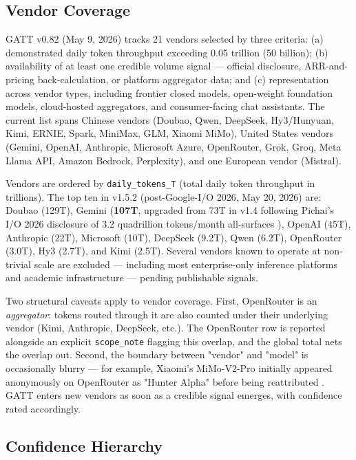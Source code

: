 \documentclass[11pt,a4paper]{article}
\begin{document}
\subsection{Vendor Coverage}

GATT v0.82 (May 9, 2026) tracks 21 vendors selected by three criteria: (a) demonstrated daily token throughput exceeding 0.05 trillion (50 billion); (b) availability of at least one credible volume signal --- official disclosure, ARR-and-pricing back-calculation, or platform aggregator data; and (c) representation across vendor types, including frontier closed models, open-weight foundation models, cloud-hosted aggregators, and consumer-facing chat assistants. The current list spans Chinese vendors (Doubao, Qwen, DeepSeek, Hy3/Hunyuan, Kimi, ERNIE, Spark, MiniMax, GLM, Xiaomi MiMo), United States vendors (Gemini, OpenAI, Anthropic, Microsoft Azure, OpenRouter, Grok, Groq, Meta Llama API, Amazon Bedrock, Perplexity), and one European vendor (Mistral).

Vendors are ordered by \texttt{daily\_tokens\_T} (total daily token throughput in trillions). The top ten in v1.5.2 (post-Google-I/O 2026, May 20, 2026) are: Doubao (129T), Gemini (\textbf{107T}, upgraded from 73T in v1.4 following Pichai's I/O 2026 disclosure of 3.2 quadrillion tokens/month all-surfaces \cite{pichai2026io}), OpenAI (45T), Anthropic (22T), Microsoft (10T), DeepSeek (9.2T), Qwen (6.2T), OpenRouter (3.0T), Hy3 (2.7T), and Kimi (2.5T). Several vendors known to operate at non-trivial scale are excluded --- including most enterprise-only inference platforms and academic infrastructure --- pending publishable signals.

Two structural caveats apply to vendor coverage. First, OpenRouter is an \emph{aggregator}: tokens routed through it are also counted under their underlying vendor (Kimi, Anthropic, DeepSeek, etc.). The OpenRouter row is reported alongside an explicit \texttt{scope\_note} flagging this overlap, and the global total nets the overlap out. Second, the boundary between "vendor" and "model" is occasionally blurry --- for example, Xiaomi's MiMo-V2-Pro initially appeared anonymously on OpenRouter as "Hunter Alpha" before being reattributed \cite{xiaomi2026mimo}. GATT enters new vendors as soon as a credible signal emerges, with confidence rated accordingly.

\subsection{Confidence Hierarchy}
\end{document}
